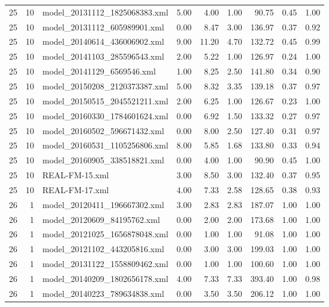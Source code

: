 \begin{table}[ht]
\begin{tabular}{rrlrrrrrr}
   25 &  10 & model\_20131112\_1825068383.xml & 5.00 & 4.00 & 1.00 & 90.75 & 0.45 & 1.00 \\ 
   25 &  10 & model\_20131112\_605989901.xml & 0.00 & 8.47 & 3.00 & 136.97 & 0.37 & 0.92 \\ 
   25 &  10 & model\_20140614\_436006902.xml & 9.00 & 11.20 & 4.70 & 132.72 & 0.45 & 0.99 \\ 
   25 &  10 & model\_20141103\_285596543.xml & 2.00 & 5.22 & 1.00 & 126.97 & 0.24 & 1.00 \\ 
   25 &  10 & model\_20141129\_6569546.xml & 1.00 & 8.25 & 2.50 & 141.80 & 0.34 & 0.90 \\ 
   25 &  10 & model\_20150208\_2120373387.xml & 5.00 & 8.32 & 3.35 & 139.18 & 0.37 & 0.97 \\ 
   25 &  10 & model\_20150515\_2045521211.xml & 2.00 & 6.25 & 1.00 & 126.67 & 0.23 & 1.00 \\ 
   25 &  10 & model\_20160330\_1784601624.xml & 0.00 & 6.92 & 1.50 & 133.32 & 0.27 & 0.97 \\ 
   25 &  10 & model\_20160502\_596671432.xml & 0.00 & 8.00 & 2.50 & 127.40 & 0.31 & 0.97 \\ 
   25 &  10 & model\_20160531\_1105256806.xml & 8.00 & 5.85 & 1.68 & 133.80 & 0.33 & 0.94 \\ 
   25 &  10 & model\_20160905\_338518821.xml & 0.00 & 4.00 & 1.00 & 90.90 & 0.45 & 1.00 \\ 
   25 &  10 & REAL-FM-15.xml & 3.00 & 8.50 & 3.00 & 132.40 & 0.37 & 0.95 \\ 
   25 &  10 & REAL-FM-17.xml & 4.00 & 7.33 & 2.58 & 128.65 & 0.38 & 0.93 \\ 
   26 &   1 & model\_20120411\_196667302.xml & 3.00 & 2.83 & 2.83 & 187.07 & 1.00 & 1.00 \\ 
   26 &   1 & model\_20120609\_84195762.xml & 0.00 & 2.00 & 2.00 & 173.68 & 1.00 & 1.00 \\ 
   26 &   1 & model\_20121025\_1656878048.xml & 0.00 & 1.00 & 1.00 & 91.08 & 1.00 & 1.00 \\ 
   26 &   1 & model\_20121102\_443205816.xml & 0.00 & 3.00 & 3.00 & 199.03 & 1.00 & 1.00 \\ 
   26 &   1 & model\_20131122\_1558809462.xml & 0.00 & 1.00 & 1.00 & 100.60 & 1.00 & 1.00 \\ 
   26 &   1 & model\_20140209\_1802656178.xml & 4.00 & 7.33 & 7.33 & 393.40 & 1.00 & 0.98 \\ 
   26 &   1 & model\_20140223\_789634838.xml & 0.00 & 3.50 & 3.50 & 206.12 & 1.00 & 1.00 \\ 

\end{tabular}
\end{table}
